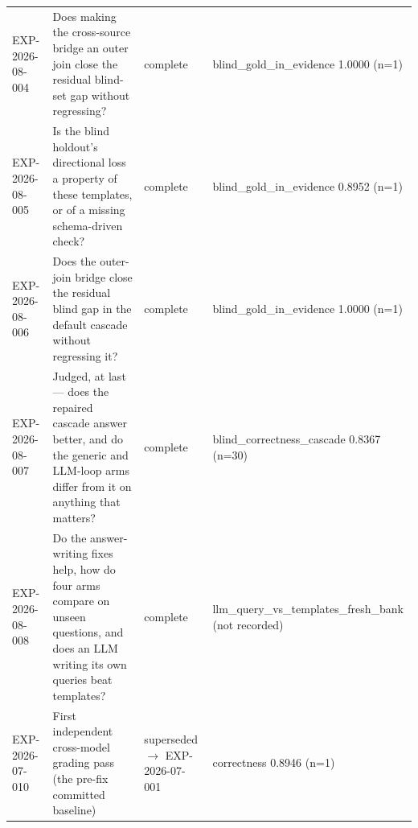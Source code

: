 \begin{tabular}{@{}L{0.15\textwidth}L{0.37\textwidth}L{0.13\textwidth}L{0.25\textwidth}@{}}
EXP-2026-08-004 & Does making the cross-source bridge an outer join close the residual blind-set gap without regressing? & complete & blind\_\allowbreak gold\_\allowbreak in\_\allowbreak evidence 1.0000 (n=1) \\
EXP-2026-08-005 & Is the blind holdout's directional loss a property of these templates, or of a missing schema-driven check? & complete & blind\_\allowbreak gold\_\allowbreak in\_\allowbreak evidence 0.8952 (n=1) \\
EXP-2026-08-006 & Does the outer-join bridge close the residual blind gap in the default cascade without regressing it? & complete & blind\_\allowbreak gold\_\allowbreak in\_\allowbreak evidence 1.0000 (n=1) \\
EXP-2026-08-007 & Judged, at last --- does the repaired cascade answer better, and do the generic and LLM-loop arms differ from it on anything that matters? & complete & blind\_\allowbreak correctness\_\allowbreak cascade 0.8367 (n=30) \\
EXP-2026-08-008 & Do the answer-writing fixes help, how do four arms compare on unseen questions, and does an LLM writing its own queries beat templates? & complete & llm\_\allowbreak query\_\allowbreak vs\_\allowbreak templates\_\allowbreak fresh\_\allowbreak bank (not recorded) \\
EXP-2026-07-010 & First independent cross-model grading pass (the pre-fix committed baseline) & superseded $\rightarrow$ EXP-2026-07-001 & correctness 0.8946 (n=1) \\
\bottomrule
\end{tabular}
